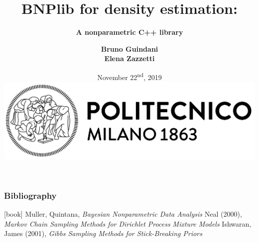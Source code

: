 \documentclass{beamer}
\title[BNPlib]{\textbf{BNPlib for density estimation:}}
\subtitle{\textbf{A nonparametric C++ library}}
\author[Guindani, Zazzetti]{\textbf{Bruno Guindani \\ Elena Zazzetti}}
\institute[PoliMi]{}
\date[2019/11/22]{
	November 22\textsuperscript{nd}, 2019 \\[15pt]
	\includegraphics[scale=.35]{../etc/logo_long.jpg}
}
\begin{document}





\begin{frame}
	\frametitle{Bibliography}
	\begin{thebibliography}{9}
		 Muller, Quintana, \textit{Bayesian Nonparametric Data Analysis}
		 Neal (2000), \textit{Markov Chain Sampling Methods for Dirichlet Process Mixture Models}
		 Ishwaran, James (2001), \textit{Gibbs Sampling Methods for Stick-Breaking Priors}	
	\end{thebibliography}
\end{frame}
\end{document}
